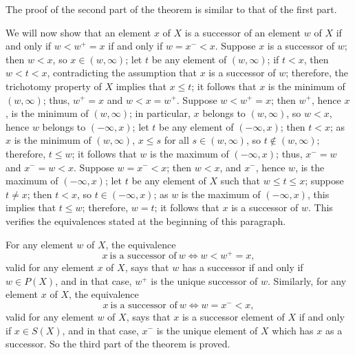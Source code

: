 \documentclass{article}
\begin{document}
The proof of the second part of the theorem is similar to that of the
first part.

We will now show that an element \(x\) of \(X\) is a successor of an
element \(w\) of \(X\) if and only if \(w < w^+ = x\) if and only if
\(w = x^- < x\).  Suppose \(x\) is a successor of \(w\); then
\(w < x\), so \(x \in (w, \infty)\); let \(t\) be any element of
\((w, \infty)\); if \(t < x\), then \(w < t < x\), contradicting the
assumption that \(x\) is a successor of \(w\); therefore, the
trichotomy property of \(X\) implies that \(x \leq t\); it follows
that \(x\) is the minimum of \((w, \infty)\); thus, \(w^+ = x\) and
\(w < x = w^+\).  Suppose \(w < w^+ = x\); then \(w^+\), hence \(x\),
is the minimum of \((w, \infty)\); in particular, \(x\) belongs to
\((w, \infty)\), so \(w < x\), hence \(w\) belongs to
\((-\infty, x)\); let \(t\) be any element of \((-\infty, x)\); then
\(t < x\); as \(x\) is the minimum of \((w, \infty)\), \(x \leq s\)
for all \(s \in (w, \infty)\), so \(t \notin (w, \infty)\); therefore,
\(t \leq w\); it follows that \(w\) is the maximum of
\((-\infty, x)\); thus, \(x^- = w\) and \(x^- = w < x\).  Suppose
\(w = x^- < x\); then \(w < x\), and \(x^-\), hence \(w\), is the
maximum of \((-\infty, x)\); let \(t\) be any element of \(X\) such
that \(w \leq t \leq x\); suppose \(t \neq x\); then \(t < x\), so
\(t \in (-\infty, x)\); as \(w\) is the maximum of \((-\infty, x)\),
this implies that \(t \leq w\); therefore, \(w = t\); it follows that
\(x\) is a successor of \(w\).  This verifies the equivalences stated
at the beginning of this paragraph.

For any element \(w\) of \(X\), the equivalence
\begin{displaymath}
  x ~ \text{is a successor of} ~ w
  \Leftrightarrow
  w < w^+ = x,
\end{displaymath}
valid for any element \(x\) of \(X\), says that \(w\) has a successor
if and only if \(w \in P(X)\), and in that case, \(w^+\) is the unique
successor of \(w\).  Similarly, for any element \(x\) of \(X\), the
equivalence
\begin{displaymath}
  x ~ \text{is a successor of} ~ w
  \Leftrightarrow
  w = x^- < x,
\end{displaymath}
valid for any element \(w\) of \(X\), says that \(x\) is a successor
element of \(X\) if and only if \(x \in S(X)\), and in that case,
\(x^-\) is the unique element of \(X\) which has \(x\) as a successor.
So the third part of the theorem is proved.
\end{document}
